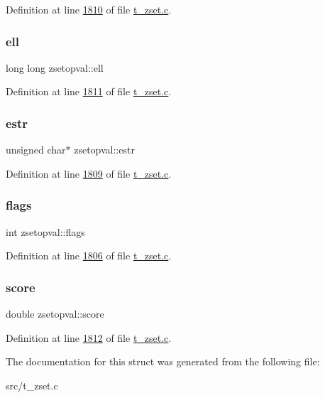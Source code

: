 Definition at line \hyperlink{t__zset_8c_source_l01810}{1810} of file \hyperlink{t__zset_8c_source}{t\+\_\+zset.\+c}.

\mbox{\label{structzsetopval_acc441f8a17c26657f1dd59d55b524062}} 
\subsubsection{\texorpdfstring{ell}{ell}}
{\footnotesize\ttfamily long long zsetopval\+::ell}



Definition at line \hyperlink{t__zset_8c_source_l01811}{1811} of file \hyperlink{t__zset_8c_source}{t\+\_\+zset.\+c}.

\mbox{\label{structzsetopval_a50d9d080aac59d5ee62e387ec08d1e85}} 
\subsubsection{\texorpdfstring{estr}{estr}}
{\footnotesize\ttfamily unsigned char$\ast$ zsetopval\+::estr}



Definition at line \hyperlink{t__zset_8c_source_l01809}{1809} of file \hyperlink{t__zset_8c_source}{t\+\_\+zset.\+c}.

\mbox{\label{structzsetopval_ad3b4870e6f1a8c0e4749494e655cbe13}} 
\subsubsection{\texorpdfstring{flags}{flags}}
{\footnotesize\ttfamily int zsetopval\+::flags}



Definition at line \hyperlink{t__zset_8c_source_l01806}{1806} of file \hyperlink{t__zset_8c_source}{t\+\_\+zset.\+c}.

\mbox{\label{structzsetopval_a3a9fa96508b40369da98242a18b04ccd}} 
\subsubsection{\texorpdfstring{score}{score}}
{\footnotesize\ttfamily double zsetopval\+::score}



Definition at line \hyperlink{t__zset_8c_source_l01812}{1812} of file \hyperlink{t__zset_8c_source}{t\+\_\+zset.\+c}.



The documentation for this struct was generated from the following file\+:\begin{DoxyCompactItemize}
\item 
src/t\+\_\+zset.\+c\end{DoxyCompactItemize}
